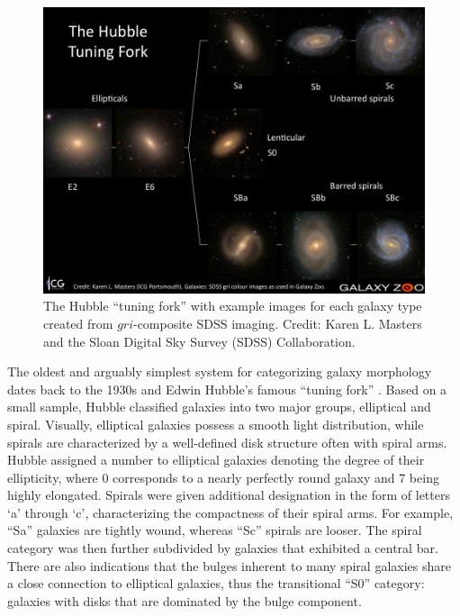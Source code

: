 \begin{figure}
\centering
\includegraphics[width=5in]{Figures/Masters_tuningfork.jpg}
\caption[Hubble tuning fork]{The Hubble ``tuning fork'' with example images for each galaxy type created from $gri$-composite SDSS imaging. Credit: Karen L. Masters and the Sloan Digital Sky Survey (SDSS) Collaboration.}
\label{fig: tuning fork}
\end{figure}

The oldest and arguably simplest system for categorizing galaxy morphology dates back to the 1930s and Edwin Hubble's famous ``tuning fork'' \citep{Hubble1926, Hubble1936}. Based on a small sample, Hubble classified galaxies into two major groups, elliptical and spiral. Visually, elliptical galaxies possess a smooth light distribution, while spirals are characterized by a well-defined disk structure often with spiral arms. Hubble assigned a number to elliptical galaxies denoting the degree of their ellipticity, where 0 corresponds to a nearly perfectly round galaxy and 7 being highly elongated. Spirals were given additional designation in the form of letters `a' through `c', characterizing the compactness of their spiral arms. For example, ``Sa'' galaxies are tightly wound, whereas ``Sc'' spirals are looser. The spiral category was then further subdivided by galaxies that exhibited a central bar. There are also indications that the bulges inherent to many spiral galaxies share a close connection to elliptical galaxies, thus the transitional ``S0'' category: galaxies with disks that are dominated by the bulge component. 

